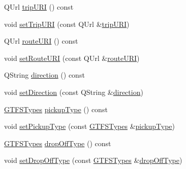 \begin{DoxyCompactItemize}
\item 
Q\+Url \mbox{\hyperlink{classQRail_1_1Fragments_1_1Fragment_a0aab02000bd98face5322e427ffaa581}{trip\+U\+RI}} () const
\item 
void \mbox{\hyperlink{classQRail_1_1Fragments_1_1Fragment_aa5949184a85b1e21135b83c34647865a}{set\+Trip\+U\+RI}} (const Q\+Url \&\mbox{\hyperlink{classQRail_1_1Fragments_1_1Fragment_a0aab02000bd98face5322e427ffaa581}{trip\+U\+RI}})
\item 
Q\+Url \mbox{\hyperlink{classQRail_1_1Fragments_1_1Fragment_a9313e0c67c93f2e7482071054c005dae}{route\+U\+RI}} () const
\item 
void \mbox{\hyperlink{classQRail_1_1Fragments_1_1Fragment_a8d04622c12e0cafe2d1020919095a5d9}{set\+Route\+U\+RI}} (const Q\+Url \&\mbox{\hyperlink{classQRail_1_1Fragments_1_1Fragment_a9313e0c67c93f2e7482071054c005dae}{route\+U\+RI}})
\item 
Q\+String \mbox{\hyperlink{classQRail_1_1Fragments_1_1Fragment_a245aaaea9da4258cba1fa53335b05546}{direction}} () const
\item 
void \mbox{\hyperlink{classQRail_1_1Fragments_1_1Fragment_a9a0d8e14fa56b6c9588bd58f363cbec5}{set\+Direction}} (const Q\+String \&\mbox{\hyperlink{classQRail_1_1Fragments_1_1Fragment_a245aaaea9da4258cba1fa53335b05546}{direction}})
\item 
\mbox{\hyperlink{classQRail_1_1Fragments_1_1Fragment_ae3c308ba6dec16f36ecc5dba59f35af3}{G\+T\+F\+S\+Types}} \mbox{\hyperlink{classQRail_1_1Fragments_1_1Fragment_afbddff790b1d207eff7adafba09f6e7c}{pickup\+Type}} () const
\item 
void \mbox{\hyperlink{classQRail_1_1Fragments_1_1Fragment_a8d4b0f9aa02575e70ff2799a4e3a53ff}{set\+Pickup\+Type}} (const \mbox{\hyperlink{classQRail_1_1Fragments_1_1Fragment_ae3c308ba6dec16f36ecc5dba59f35af3}{G\+T\+F\+S\+Types}} \&\mbox{\hyperlink{classQRail_1_1Fragments_1_1Fragment_afbddff790b1d207eff7adafba09f6e7c}{pickup\+Type}})
\item 
\mbox{\hyperlink{classQRail_1_1Fragments_1_1Fragment_ae3c308ba6dec16f36ecc5dba59f35af3}{G\+T\+F\+S\+Types}} \mbox{\hyperlink{classQRail_1_1Fragments_1_1Fragment_a8cb44b415a121dfa2b0c6046df4bea27}{drop\+Off\+Type}} () const
\item 
void \mbox{\hyperlink{classQRail_1_1Fragments_1_1Fragment_adf2f6016bb7f1fea030e910b9a062735}{set\+Drop\+Off\+Type}} (const \mbox{\hyperlink{classQRail_1_1Fragments_1_1Fragment_ae3c308ba6dec16f36ecc5dba59f35af3}{G\+T\+F\+S\+Types}} \&\mbox{\hyperlink{classQRail_1_1Fragments_1_1Fragment_a8cb44b415a121dfa2b0c6046df4bea27}{drop\+Off\+Type}})
\end{DoxyCompactItemize}



